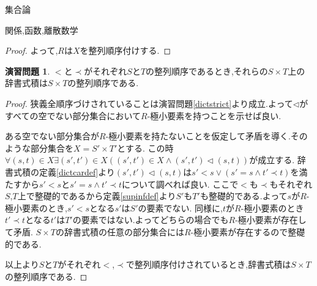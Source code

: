 \documentclass[14pt]{jsarticle}
\theoremstyle{definition}
\newtheorem{doril}[dfn]{演習問題}
\begin{document}
\begin{section}{集合論}
\begin{subsection}{関係,函数,離散数学}
\begin{proof}
よって,$R$は$X$を整列順序付けする.
\end{proof}
\begin{doril}
\label{dectcartwell-ordered}
$<$と$\prec$がそれぞれ$S$と$T$の整列順序であるとき,それらの$S \times T$上の辞書式積は$S\times T$の整列順序である.
\end{doril}
\begin{proof}
狭義全順序づけされていることは演習問題\ref{dictstrict}より成立.よって$\triangleleft$がすべての空でない部分集合において$R$-極小要素を持つことを示せば良い.\par
ある空でない部分集合が$R$-極小要素を持たないことを仮定して矛盾を導く.そのような部分集合を$X=S'\times T'$とする.
この時$\forall(s,t)\in X \exists (s',t')\in X ((s',t')\in X \land (s',t')\triangleleft (s,t))$が成立する.
辞書式積の定義\ref{dictcardef}より$(s',t')\triangleleft(s,t)$は$s'<s \lor(s'=s \land t' \prec t)$を満たすから$s'<s$と$s'=s \land t'\prec t$について調べれば良い.
ここで$<$も$\prec$もそれぞれ$S$,$T$上で整礎的であるから定義\ref{supinfdef}より$S'$も$T'$も整礎的である.よって$s$が$R$-極小要素のとき,$s'<s$となる$s'$は$S'$の要素でない.
同様に,$t$が$R$-極小要素のとき$t'\prec t$となる$t'$は$T'$の要素ではない.よってどちらの場合でも$R$-極小要素が存在して矛盾.
$S\times T$の辞書式積の任意の部分集合には$R$-極小要素が存在するので整礎的である.\par
以上より$S$と$T$がそれぞれ$<$,$\prec$で整列順序付けされているとき,辞書式積は$S\times T$の整列順序である.
\end{proof}
\end{subsection}


\end{section}
\end{document}
